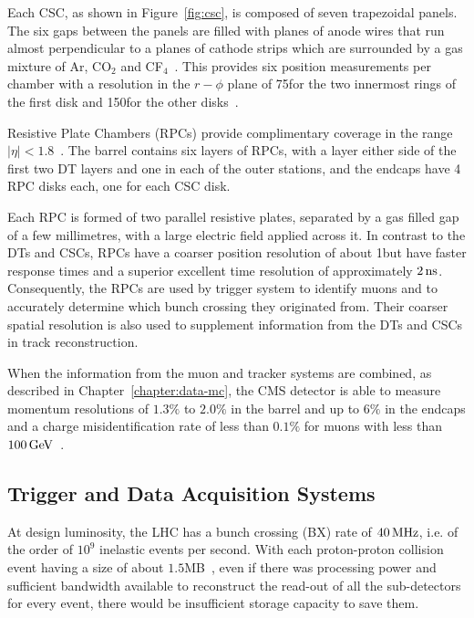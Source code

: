 Each CSC, as shown in Figure~\ref{fig:csc}, is composed of seven trapezoidal panels. 
The six gaps between the panels are filled with planes of anode wires that run almost perpendicular to a planes of cathode strips which are surrounded by a gas mixture of Ar, CO$_{2}$ and CF$_{4}$~\cite{Anderson:2004ep}.
This provides six position measurements per chamber with a resolution in the $r-\phi$ plane of 75\mum for the two innermost rings of the first disk and 150\mum for the other disks~\cite{CMS:1997iti}.

Resistive Plate Chambers (RPCs) provide complimentary coverage in the range $|\eta| < 1.8$~\cite{Battilana:2017mrm}.
The barrel contains six layers of RPCs, with a layer either side of the first two DT layers and one in each of the outer stations, and the endcaps have 4 RPC disks each, one for each CSC disk.

Each RPC is formed of two parallel resistive plates, separated by a gas filled gap of a few millimetres, with a large electric field applied across it.
In contrast to the DTs and CSCs, RPCs have a coarser position resolution of about 1\cm but have faster response times and a superior excellent time resolution of approximately $2\text{\,ns}$.
Consequently, the RPCs are used by trigger system to identify muons and to accurately determine which bunch crossing they originated from.
Their coarser spatial resolution is also used to supplement information from the DTs and CSCs in track reconstruction.

When the information from the muon and tracker systems are combined, as described in Chapter~\ref{chapter:data-mc}, the CMS detector is able to measure momentum resolutions of $1.3\%$ to $2.0\%$ in the barrel and up to $6\%$ in the endcaps and a charge misidentification rate of less than $0.1\%$ for muons with \pT less than $100 \,\text{Ge\hspace{-.08em}V}$~\cite{Chatrchyan:2012xi,Chatrchyan:2013sba}.

\subsection{Trigger and Data Acquisition Systems}\label{subsec:trigger}
At design luminosity, the LHC has a bunch crossing (BX) rate of $40\text{\,MHz}$, i.e. of the order of $10^{9}$ inelastic events per second.
With each proton-proton collision event having a size of about $1.5$MB~\cite{Bayatian:2006nff}, even if there was processing power and sufficient bandwidth available to reconstruct the read-out of all the sub-detectors for every event, there would be insufficient storage capacity to save them.


